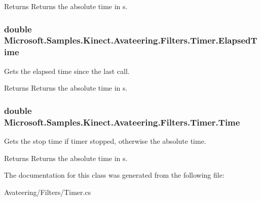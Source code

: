 \begin{DoxyReturn}{Returns}
Returns the absolute time in s.
\end{DoxyReturn}
\hypertarget{class_microsoft_1_1_samples_1_1_kinect_1_1_avateering_1_1_filters_1_1_timer_a00024192f2aa0880fbd93bd2340d4c31}{
\subsubsection[{Elapsed\+Time}]{\setlength{\rightskip}{0pt plus 5cm}double Microsoft.\+Samples.\+Kinect.\+Avateering.\+Filters.\+Timer.\+Elapsed\+Time\hspace{0.3cm}{\ttfamily [get]}}}\label{class_microsoft_1_1_samples_1_1_kinect_1_1_avateering_1_1_filters_1_1_timer_a00024192f2aa0880fbd93bd2340d4c31}


Gets the elapsed time since the last call. 

\begin{DoxyReturn}{Returns}
Returns the absolute time in s.
\end{DoxyReturn}
\hypertarget{class_microsoft_1_1_samples_1_1_kinect_1_1_avateering_1_1_filters_1_1_timer_a9b9f45503cee32ccde7f8e6c9266775f}{
\subsubsection[{Time}]{\setlength{\rightskip}{0pt plus 5cm}double Microsoft.\+Samples.\+Kinect.\+Avateering.\+Filters.\+Timer.\+Time\hspace{0.3cm}{\ttfamily [get]}}}\label{class_microsoft_1_1_samples_1_1_kinect_1_1_avateering_1_1_filters_1_1_timer_a9b9f45503cee32ccde7f8e6c9266775f}


Gets the stop time if timer stopped, otherwise the absolute time. 

\begin{DoxyReturn}{Returns}
Returns the absolute time in s.
\end{DoxyReturn}


The documentation for this class was generated from the following file\+:\begin{DoxyCompactItemize}
\item 
Avateering/\+Filters/Timer.\+cs\end{DoxyCompactItemize}
